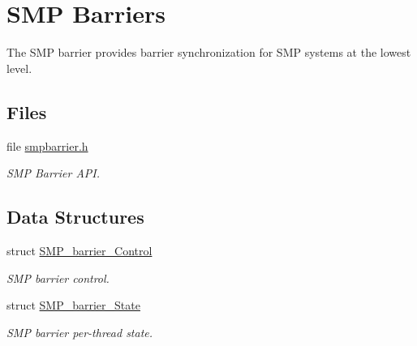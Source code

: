 \hypertarget{group__RTEMSScoreSMPBarrier}{}\section{S\+MP Barriers}
\label{group__RTEMSScoreSMPBarrier}


The S\+MP barrier provides barrier synchronization for S\+MP systems at the lowest level.  


\subsection*{Files}
\begin{DoxyCompactItemize}
\item 
file \mbox{\hyperlink{smpbarrier_8h}{smpbarrier.\+h}}
\begin{DoxyCompactList}\small\item\em S\+MP Barrier A\+PI. \end{DoxyCompactList}\end{DoxyCompactItemize}
\subsection*{Data Structures}
\begin{DoxyCompactItemize}
\item 
struct \mbox{\hyperlink{structSMP__barrier__Control}{S\+M\+P\+\_\+barrier\+\_\+\+Control}}
\begin{DoxyCompactList}\small\item\em S\+MP barrier control. \end{DoxyCompactList}\item 
struct \mbox{\hyperlink{structSMP__barrier__State}{S\+M\+P\+\_\+barrier\+\_\+\+State}}
\begin{DoxyCompactList}\small\item\em S\+MP barrier per-\/thread state. \end{DoxyCompactList}\end{DoxyCompactItemize}
